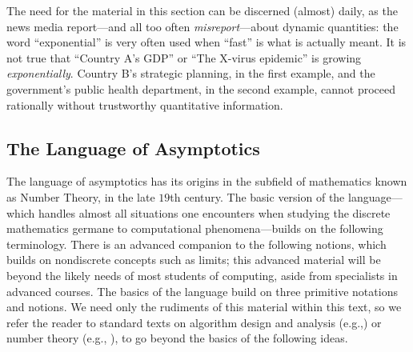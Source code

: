 The need for the material in this section can be discerned (almost)
daily, as the news media report---and all too often {\em
  misreport}---about dynamic quantities: the word ``exponential'' is
very often used when ``fast'' is what is actually meant.  It is not
true that ``Country A's GDP'' or ``The X-virus epidemic'' is growing
{\em exponentially}.  Country B's strategic planning, in the first
example, and the government's public health department, in the second
example, cannot proceed rationally without trustworthy quantitative
information.


\subsection{The Language of Asymptotics}
\label{sec:language-asymptotics}

The language of asymptotics has its origins in the subfield of
mathematics known as Number Theory, in the late $19$th century.  The
basic version of the language---which handles almost all situations
one encounters when studying the discrete mathematics germane to
computational phenomena---builds on the following terminology.  There
is an advanced companion to the following notions, which builds on
nondiscrete concepts such as limits; this advanced material will be
beyond the likely needs of most students of computing, aside from
specialists in advanced courses.  The basics of the language build on
three primitive notations and notions.  We need only the rudiments of
this material within this text, so we refer the reader to standard
texts on algorithm design and analysis (e.g.,\cite{CLRS}) or number
theory (e.g., \cite{NivenZ80}), to go beyond the basics of the
following ideas.

